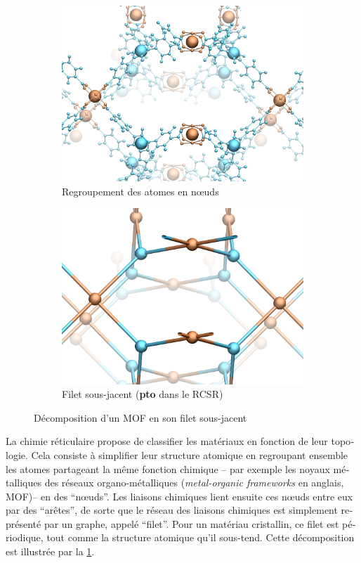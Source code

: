 \documentclass[thesis]{subfiles}
\begin{document}
\begin{otherlanguage}{french}
\begin{figure}
	\begin{subfigure}{0.5\linewidth}
		\centering
		\includegraphics[width=0.95\linewidth]{figures/topology/mof14_2.jpg}
		\caption{Regroupement des atomes en n\oe uds}
	\end{subfigure}%
	\begin{subfigure}{0.5\linewidth}
		\centering
		\includegraphics[width=0.95\linewidth]{figures/topology/mof14_3.jpg}
		\caption{Filet sous-jacent (\textbf{pto} dans le RCSR)}
	\end{subfigure}

	\caption{Décomposition d'un MOF en son filet sous-jacent}\label{fig_decompositionfilet}
\end{figure}

La chimie réticulaire \autocite{reticularChemistry,reticularSynthesis} propose de classifier les matériaux en fonction de leur topologie. Cela consiste à simplifier leur structure atomique en regroupant ensemble les atomes partageant la même fonction chimique -- par exemple les noyaux métalliques des réseaux organo-métalliques (\textit{metal-organic frameworks} en anglais, MOF)-- en des ``n\oe uds''. Les liaisons chimiques lient ensuite ces n\oe uds entre eux par des ``arêtes'', de sorte que le réseau des liaisons chimiques est simplement représenté par un graphe, appelé ``filet''. Pour un matériau cristallin, ce filet est périodique, tout comme la structure atomique qu'il sous-tend. Cette décomposition est illustrée par la \cref{fig_decompositionfilet}.


\end{otherlanguage}
\end{document}
